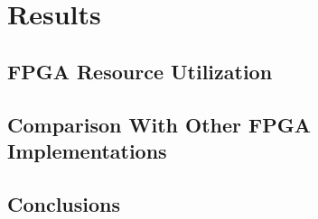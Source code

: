 
\chapter{Results}
\label{chapter:results}



\section{FPGA Resource Utilization}
\label{section:result_resourceUtilization}



\section{Comparison With Other FPGA Implementations}
\label{sec:results_comparison_other_fpga}



\section{Conclusions}
\label{sec:results_conclusions}



